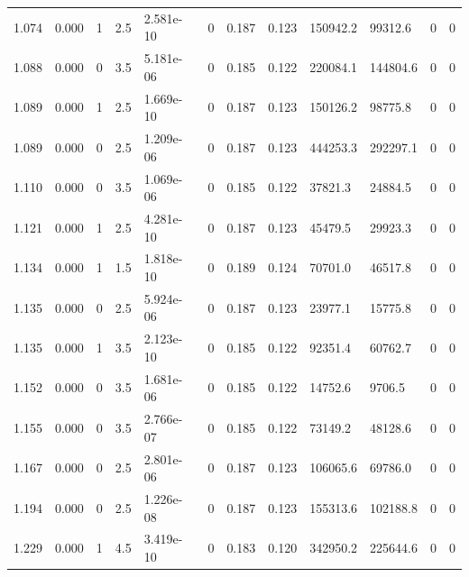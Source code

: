 \documentclass[preview]{standalone}
\begin{document}
{{{\begin{tabular}{L{1.2cm}C{1.2cm} C{0.3cm}C{0.5cm} C{1.4cm}C{1.4cm} C{1.4cm}C{1.4cm} C{1.6cm}C{1.6cm} C{1.6cm}C{1.6cm}}
  1.074  &  0.000  & 1     & 2.5 &  2.581e-10  & 0  &  0.187&   0.123& 150942.2 & 99312.6   &  0 & 0  \\ 
  1.088  &  0.000  & 0     & 3.5 &  5.181e-06  & 0  &  0.185&   0.122& 220084.1 & 144804.6   &  0 & 0  \\ 
  1.089  &  0.000  & 1     & 2.5 &  1.669e-10  & 0  &  0.187&   0.123& 150126.2 & 98775.8   &  0 & 0  \\ 
  1.089  &  0.000  & 0     & 2.5 &  1.209e-06  & 0  &  0.187&   0.123& 444253.3 & 292297.1   &  0 & 0  \\ 
  1.110  &  0.000  & 0     & 3.5 &  1.069e-06  & 0  &  0.185&   0.122& 37821.3 & 24884.5   &  0 & 0  \\ 
  1.121  &  0.000  & 1     & 2.5 &  4.281e-10  & 0  &  0.187&   0.123& 45479.5 & 29923.3   &  0 & 0  \\ 
  1.134  &  0.000  & 1     & 1.5 &  1.818e-10  & 0  &  0.189&   0.124& 70701.0 & 46517.8   &  0 & 0  \\ 
  1.135  &  0.000  & 0     & 2.5 &  5.924e-06  & 0  &  0.187&   0.123& 23977.1 & 15775.8   &  0 & 0  \\ 
  1.135  &  0.000  & 1     & 3.5 &  2.123e-10  & 0  &  0.185&   0.122& 92351.4 & 60762.7   &  0 & 0  \\ 
  1.152  &  0.000  & 0     & 3.5 &  1.681e-06  & 0  &  0.185&   0.122& 14752.6 & 9706.5   &  0 & 0  \\ 
  1.155  &  0.000  & 0     & 3.5 &  2.766e-07  & 0  &  0.185&   0.122& 73149.2 & 48128.6   &  0 & 0  \\ 
  1.167  &  0.000  & 0     & 2.5 &  2.801e-06  & 0  &  0.187&   0.123& 106065.6 & 69786.0   &  0 & 0  \\ 
  1.194  &  0.000  & 0     & 2.5 &  1.226e-08  & 0  &  0.187&   0.123& 155313.6 & 102188.8   &  0 & 0  \\ 
  1.229  &  0.000  & 1     & 4.5 &  3.419e-10  & 0  &  0.183&   0.120& 342950.2 & 225644.6   &  0 & 0  \\ 
\hline 
\end{tabular} 

}}}
\end{document}
